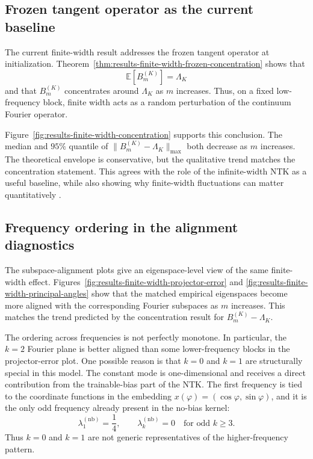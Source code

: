 \subsection{Frozen tangent operator as the current baseline}
\label{subsec:discussion-q2-frozen}

The current finite-width result addresses the frozen tangent operator at
initialization. Theorem~\ref{thm:results-finite-width-frozen-concentration}
shows that
\[
	\mathbb E[B_m^{(K)}]=\Lambda_K
\]
and that \(B_m^{(K)}\) concentrates around \(\Lambda_K\) as \(m\) increases.
Thus, on a fixed low-frequency block, finite width acts as a random perturbation
of the continuum Fourier operator.

Figure~\ref{fig:results-finite-width-concentration} supports this conclusion.
The median and \(95\%\) quantile of
\(\|B_m^{(K)}-\Lambda_K\|_{\max}\) both decrease as \(m\) increases. The
theoretical envelope is conservative, but the qualitative trend matches the
concentration statement. This agrees with the role of the infinite-width NTK as
a useful baseline, while also showing why finite-width fluctuations can matter
quantitatively
\citep{jacot2018ntk,lee2020wide,bordelon2023dynamicsfinitewidthkernel,vyas2022limitationsntkunderstandinggeneralization}.

\subsection{Frequency ordering in the alignment diagnostics}
\label{subsec:discussion-q2-alignment-ordering}

The subspace-alignment plots give an eigenspace-level view of the same
finite-width effect. Figures~\ref{fig:results-finite-width-projector-error} and
\ref{fig:results-finite-width-principal-angles} show that the matched empirical
eigenspaces become more aligned with the corresponding Fourier subspaces as
\(m\) increases. This matches the trend predicted by the concentration result for
\(B_m^{(K)}-\Lambda_K\).

The ordering across frequencies is not perfectly monotone. In particular, the
\(k=2\) Fourier plane is better aligned than some lower-frequency blocks in the
projector-error plot. One possible reason is that \(k=0\) and \(k=1\) are structurally special in this
model. The constant mode is one-dimensional and receives a direct contribution
from the trainable-bias part of the NTK. The first frequency is tied to the
coordinate functions in the embedding
\(x(\varphi)=(\cos\varphi,\sin\varphi)\), and it is the only odd frequency
already present in the no-bias kernel:
\[
	\lambda_1^{(\mathrm{nb})}=\frac14,
	\qquad
	\lambda_k^{(\mathrm{nb})}=0
	\quad \text{for odd } k\ge 3.
\]
Thus \(k=0\) and \(k=1\) are not generic representatives of the
higher-frequency pattern.

